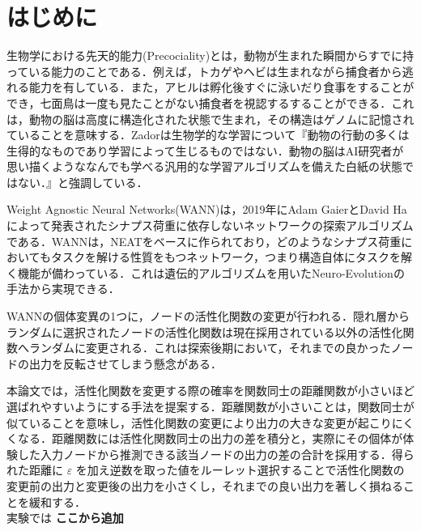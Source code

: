 \section{はじめに}
生物学における先天的能力(Precociality)とは，動物が生まれた瞬間からすでに持っている能力のことである．例えば，トカゲやヘビは生まれながら捕食者から逃れる能力を有している．また，アヒルは孵化後すぐに泳いだり食事をすることができ，七面鳥は一度も見たことがない捕食者を視認するすることができる．これは，動物の脳は高度に構造化された状態で生まれ，その構造はゲノムに記憶されていることを意味する．Zadorは生物学的な学習について『動物の行動の多くは生得的なものであり学習によって生じるものではない．動物の脳はAI研究者が思い描くようななんでも学べる汎用的な学習アルゴリズムを備えた白紙の状態ではない．』と強調している\cite{先天的能力}．


Weight Agnostic Neural Networks(WANN)は，2019年にAdam GaierとDavid Haによって発表されたシナプス荷重に依存しないネットワークの探索アルゴリズムである\cite{WANN}．WANNは，NEAT\cite{NEAT}をベースに作られており，どのようなシナプス荷重においてもタスクを解ける性質をもつネットワーク，つまり構造自体にタスクを解く機能が備わっている．これは遺伝的アルゴリズム\cite{遺伝的アルゴリズム}を用いたNeuro-Evolution\cite{NE}の手法から実現できる．


WANNの個体変異の1つに，ノードの活性化関数の変更が行われる．隠れ層からランダムに選択されたノードの活性化関数は現在採用されている以外の活性化関数へランダムに変更される．これは探索後期において，それまでの良かったノードの出力を反転させてしまう懸念がある．


本論文では，活性化関数を変更する際の確率を関数同士の距離関数が小さいほど選ばれやすいようにする手法を提案する．距離関数が小さいことは，関数同士が似ていることを意味し，活性化関数の変更により出力の大きな変更が起こりにくくなる．距離関数には活性化関数同士の出力の差を積分と，実際にその個体が体験した入力ノードから推測できる該当ノードの出力の差の合計を採用する．得られた距離に $ \varepsilon $ を加え逆数を取った値をルーレット選択することで活性化関数の変更前の出力と変更後の出力を小さくし，それまでの良い出力を著しく損ねることを緩和する．\\
実験では \textbf{ここから追加}